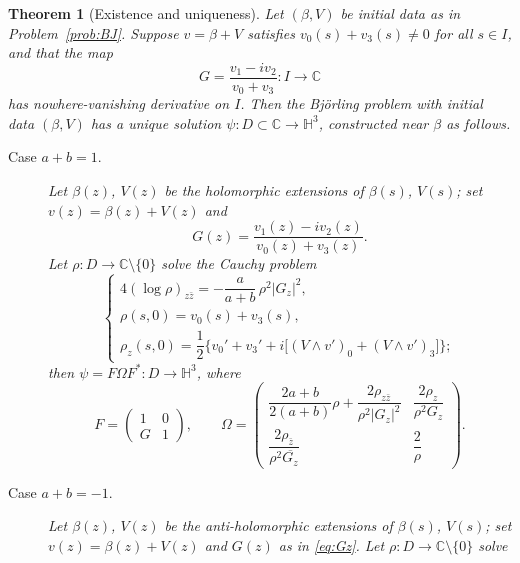 \documentclass[11pt,a4paper]{article}
\newcommand{\CC}{\mathbb{C}}
\newcommand{\Hyp}{\mathbb{H}^3}                      %
\theoremstyle{plain}
\newtheorem{theorem}{Theorem}
\theoremstyle{definition}
\theoremstyle{remark}
\begin{document}
\begin{theorem}[Existence and uniqueness]\label{thm:BJ}
Let $(\beta,V)$ be initial data as in Problem~\ref{prob:BJ}. Suppose
$v=\beta+V$ satisfies $v_0(s)+v_3(s)\neq0$ for all $s\in I$, and that the
map
\begin{equation}\label{eq:Gextra}
  G = \frac{v_1-iv_2}{v_0+v_3} : I\to\CC
\end{equation}
has nowhere-vanishing derivative on $I$. Then the Björling problem with
initial data $(\beta,V)$ has a \emph{unique} solution $\psi:D\subset\CC\to
\Hyp$, constructed near $\beta$ as follows.
\begin{description}
\item[Case $a+b=1$.] Let $\beta(z)$, $V(z)$ be the holomorphic
  extensions of $\beta(s)$, $V(s)$; set $v(z)=\beta(z)+V(z)$ and
  \begin{equation}\label{eq:Gz}
    G(z) = \frac{v_1(z)-iv_2(z)}{v_0(z)+v_3(z)}.
  \end{equation}
  Let $\rho:D\to\CC\setminus\{0\}$ solve the Cauchy problem
  \begin{equation}\label{eq:Lmodcompleted}
    \begin{cases}
      4(\log\rho)_{z\bar z} = -\dfrac{a}{a+b}\,\rho^2|G_z|^2,\\[1mm]
      \rho(s,0) = v_0(s)+v_3(s),\\[1mm]
      \rho_z(s,0) = \dfrac12\Big\{v_0'+v_3'
        + i\big[(V\wedge v')_0+(V\wedge v')_3\big]\Big\};
    \end{cases}
  \end{equation}
  then $\psi = F\Omega F^* : D\to\Hyp$, where
  \begin{equation}\label{eq:FOmega}
    F=\begin{pmatrix}1&0\\ G&1\end{pmatrix}, \qquad
    \Omega = \begin{pmatrix}
      \dfrac{2a+b}{2(a+b)}\rho + \dfrac{2\rho_{z\bar z}}{\rho^2|G_z|^2}
        & \dfrac{2\rho_z}{\rho^2 G_z}\\[3mm]
      \dfrac{2\rho_{\bar z}}{\rho^2\overline{G_z}} & \dfrac2\rho
    \end{pmatrix}.
  \end{equation}
\item[Case $a+b=-1$.] Let $\beta(z)$, $V(z)$ be the \emph{anti}-holomorphic
  extensions of $\beta(s)$, $V(s)$; set $v(z)=\beta(z)+V(z)$ and $G(z)$ as
  in \eqref{eq:Gz}. Let $\rho:D\to\CC\setminus\{0\}$ solve
  \begin{equation}\label{eq:Lmodcompleted2}

\end{equation}
\end{description}
\end{theorem}
\end{document}
